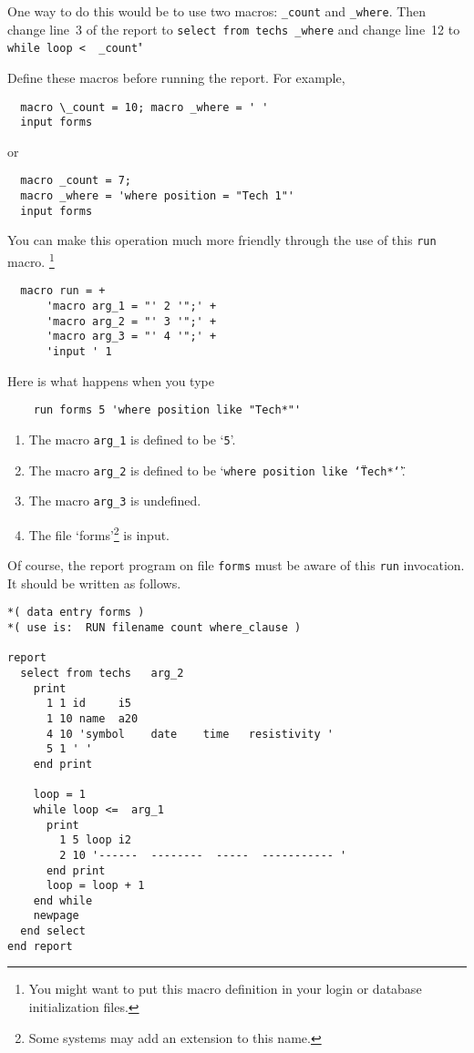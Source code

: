 \documentclass[11pt,a4paper]{report}
\begin{document}
One way to do this would be to use
two macros: \verb!_count! and \verb!_where!.
Then
change line~3 of the report to
\verb!select from techs _where!
and change line~12 to
\verb!while loop <  _count!"
 
Define these macros before running the report.
For example,
\begin{verbatim}
  macro \_count = 10; macro _where = ' '
  input forms
\end{verbatim}
or
\begin{verbatim}
  macro _count = 7;
  macro _where = 'where position = "Tech 1"'
  input forms
\end{verbatim}
 
\medskip
 
You can make this operation much more friendly through the use
of this \verb!run! macro.%
\footnote{You might want to put this macro definition in your
  login or database initialization files.}

\begin{verbatim}
  macro run = +
      'macro arg_1 = "' 2 '";' + 
      'macro arg_2 = "' 3 '";' + 
      'macro arg_3 = "' 4 '";' +
      'input ' 1
\end{verbatim}

Here is what happens when you type
\begin{verbatim}
    run forms 5 'where position like "Tech*"'
\end{verbatim}

\begin{enumerate}
\item The macro \verb!arg_1! is defined to be `{\tt5}'.
\item The macro \verb!arg_2! is defined to be
      `{\tt where position like \char`\"Tech*\char`\"}'.
\item The macro \verb!arg_3! is undefined.
\item The file `forms'\footnote{Some systems may add an
extension to this name.} is input.
\end{enumerate}
 
Of course, the report program on file \verb!forms! must be aware of
this \verb!run! invocation.  It should be written as follows.
 
\demobreak
\begin{verbatim}
*( data entry forms )
*( use is:  RUN filename count where_clause )
 
report
  select from techs   arg_2
    print
      1 1 id     i5
      1 10 name  a20
      4 10 'symbol    date    time   resistivity '
      5 1 ' '
    end print
 
    loop = 1
    while loop <=  arg_1
      print
        1 5 loop i2
        2 10 '------  --------  -----  ----------- '
      end print
      loop = loop + 1
    end while
    newpage
  end select
end report
\end{verbatim}
 
\end{document}
